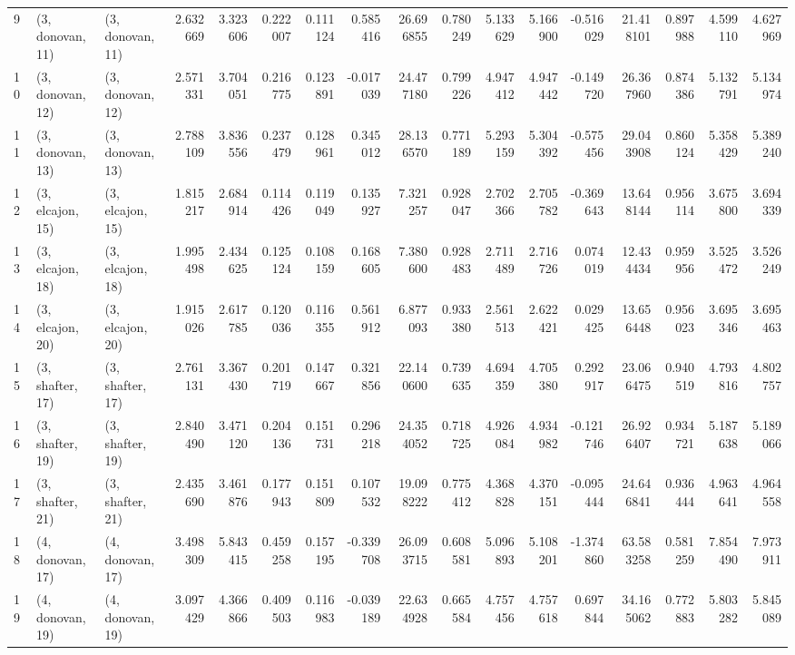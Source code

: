 \begin{tabular}{lllrrrrrrrrrrrrrr}
9  &  (3, donovan, 11) &  (3, donovan, 11) &  2.632669 &  3.323606 &   0.222007 &  0.111124 &  0.585416 &  26.696855 &  0.780249 &   5.133629 &  5.166900 & -0.516029 &  21.418101 &  0.897988 &  4.599110 &  4.627969 \\
10 &  (3, donovan, 12) &  (3, donovan, 12) &  2.571331 &  3.704051 &   0.216775 &  0.123891 & -0.017039 &  24.477180 &  0.799226 &   4.947412 &  4.947442 & -0.149720 &  26.367960 &  0.874386 &  5.132791 &  5.134974 \\
11 &  (3, donovan, 13) &  (3, donovan, 13) &  2.788109 &  3.836556 &   0.237479 &  0.128961 &  0.345012 &  28.136570 &  0.771189 &   5.293159 &  5.304392 & -0.575456 &  29.043908 &  0.860124 &  5.358429 &  5.389240 \\
12 &  (3, elcajon, 15) &  (3, elcajon, 15) &  1.815217 &  2.684914 &   0.114426 &  0.119049 &  0.135927 &   7.321257 &  0.928047 &   2.702366 &  2.705782 & -0.369643 &  13.648144 &  0.956114 &  3.675800 &  3.694339 \\
13 &  (3, elcajon, 18) &  (3, elcajon, 18) &  1.995498 &  2.434625 &   0.125124 &  0.108159 &  0.168605 &   7.380600 &  0.928483 &   2.711489 &  2.716726 &  0.074019 &  12.434434 &  0.959956 &  3.525472 &  3.526249 \\
14 &  (3, elcajon, 20) &  (3, elcajon, 20) &  1.915026 &  2.617785 &   0.120036 &  0.116355 &  0.561912 &   6.877093 &  0.933380 &   2.561513 &  2.622421 &  0.029425 &  13.656448 &  0.956023 &  3.695346 &  3.695463 \\
15 &  (3, shafter, 17) &  (3, shafter, 17) &  2.761131 &  3.367430 &   0.201719 &  0.147667 &  0.321856 &  22.140600 &  0.739635 &   4.694359 &  4.705380 &  0.292917 &  23.066475 &  0.940519 &  4.793816 &  4.802757 \\
16 &  (3, shafter, 19) &  (3, shafter, 19) &  2.840490 &  3.471120 &   0.204136 &  0.151731 &  0.296218 &  24.354052 &  0.718725 &   4.926084 &  4.934982 & -0.121746 &  26.926407 &  0.934721 &  5.187638 &  5.189066 \\
17 &  (3, shafter, 21) &  (3, shafter, 21) &  2.435690 &  3.461876 &   0.177943 &  0.151809 &  0.107532 &  19.098222 &  0.775412 &   4.368828 &  4.370151 & -0.095444 &  24.646841 &  0.936444 &  4.963641 &  4.964558 \\
18 &  (4, donovan, 17) &  (4, donovan, 17) &  3.498309 &  5.843415 &   0.459258 &  0.157195 & -0.339708 &  26.093715 &  0.608581 &   5.096893 &  5.108201 & -1.374860 &  63.583258 &  0.581259 &  7.854490 &  7.973911 \\
19 &  (4, donovan, 19) &  (4, donovan, 19) &  3.097429 &  4.366866 &   0.409503 &  0.116983 & -0.039189 &  22.634928 &  0.665584 &   4.757456 &  4.757618 &  0.697844 &  34.165062 &  0.772883 &  5.803282 &  5.845089 \\

\end{tabular}
